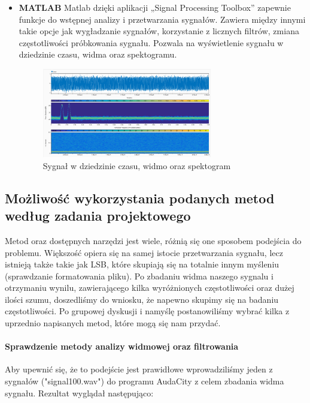 \documentclass[a4paper,titleauthor]{mwart}
\begin{document}
\begin{itemize}
	\item \textbf{MATLAB} \newline\newline
	Matlab dzięki aplikacji „Signal Processing Toolbox” zapewnie funkcje do wstępnej analizy i przetwarzania sygnałów. Zawiera między innymi takie opcje jak wygładzanie sygnałów, korzystanie z licznych filtrów, zmiana częstotliwości próbkowania sygnału. \newline
	Pozwala na wyświetlenie sygnału w dziedzinie czasu, widma oraz spektogramu.\newline
	
	\begin{figure}[h]
		\centering
		\includegraphics[width=0.7\textwidth]{matlab1.PNG}
		\caption{Sygnał w dziedzinie czasu, widmo oraz spektogram}
	\end{figure}
	
\end{itemize}

\subsection{Możliwość wykorzystania podanych metod według zadania projektowego}

Metod oraz dostępnych narzędzi jest wiele, różnią się one sposobem podejścia do problemu. Większość opiera się na samej istocie przetwarzania sygnału, lecz istnieją także takie jak LSB, które skupiają się na totalnie innym myśleniu (sprawdzanie formatowania pliku). Po zbadaniu widma naszego sygnalu i otrzymaniu wynilu, zawierającego kilka wyróżnionych częstotliwości oraz dużej ilości szumu, doszedliśmy do wniosku, że napewno skupimy się na badaniu częstotliwości. Po grupowej dyskusji i namyślę postanowiliśmy wybrać kilka z uprzednio napisanych metod, które mogą się nam przydać.

\paragraph{Sprawdzenie metody analizy widmowej oraz filtrowania}
Aby upewnić się, że to podejście jest prawidłowe wprowadziliśmy jeden z sygnałów ("signal100.wav") do programu AudaCity z celem zbadania widma sygnału. Rezultat wyglądał następująco:
\end{document}
